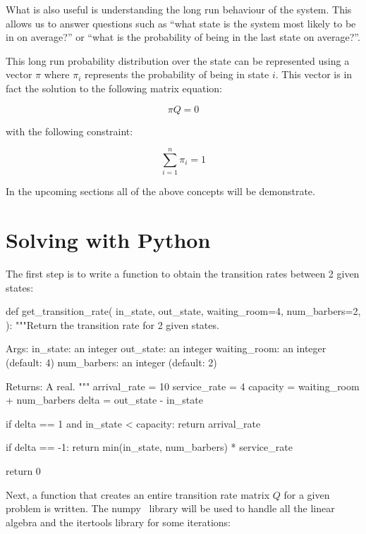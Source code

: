 What is also useful is understanding the long run behaviour of the
system. This allows us to answer questions such as ``what state is the system most
likely to be in on average?'' or ``what is the probability of being in the last
state on average?''.

This long run probability distribution over the state can be represented using a
vector \(\pi\) where \(\pi_i\) represents the probability of being in state
\(i\). This vector is in fact the solution to the following matrix equation:

\begin{equation}
    \pi Q = 0
    \label{eqn:continuous_time_markov_process_steady_state}
\end{equation}

with the following constraint:

\begin{equation}
    \sum_{i=1}^{n}\pi_i = 1
\end{equation}

In the upcoming sections all of the above concepts will be demonstrate.

\section{Solving with Python}\label{sec:markov_chains_solving-with-python}

The first step is to write a function to obtain the transition
rates between 2 given states:


\begin{pyin}
def get_transition_rate(
    in_state,
    out_state,
    waiting_room=4,
    num_barbers=2,
):
    """Return the transition rate for 2 given states.

    Args:
        in_state: an integer
        out_state: an integer
        waiting_room: an integer (default: 4)
        num_barbers:  an integer (default: 2)

    Returns:
        A real.
    """
    arrival_rate = 10
    service_rate = 4
    capacity = waiting_room + num_barbers
    delta = out_state - in_state

    if delta == 1 and in_state < capacity:
        return arrival_rate

    if delta == -1:
        return min(in_state, num_barbers) * service_rate

    return 0
\end{pyin}

Next, a function that creates an entire transition rate matrix \(Q\) for a given
problem is written. The numpy~\cite{harris2020array} library will be used to
handle all the linear algebra and the itertools library for
some iterations:

